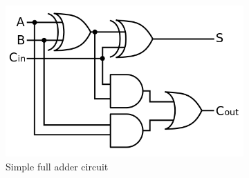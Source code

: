 \documentclass{article}
\def\layersep{2.5cm}
\begin{document}
\begin{figure}[t]
    \centering
    \begin{subfigure}[t]{0.5\textwidth}
        \centering

        	
        	
        \includegraphics[width=\textwidth]{full-adder-circuit}

        \caption{Simple full adder circuit}
    \end{subfigure}%
    ~
    \begin{subfigure}[t]{0.5\textwidth}
        \centering
    

\end{subfigure}
\end{figure}
\end{document}
